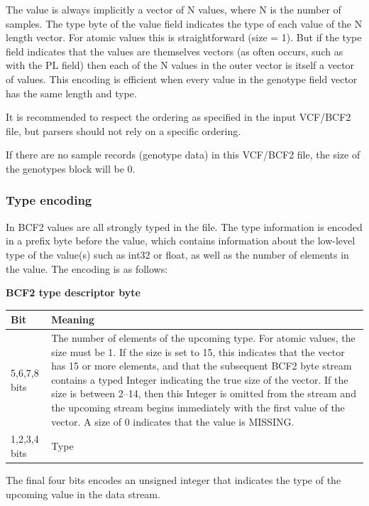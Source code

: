 \documentclass[8pt]{article}
\begin{document}
The value is always implicitly a vector of N values, where N is the number of samples.
The type byte of the value field indicates the type of each value of the N length vector.
For atomic values this is straightforward (size = 1).
But if the type field indicates that the values are themselves vectors (as often occurs, such as with the PL field) then each of the N values in the outer vector is itself a vector of values.
This encoding is efficient when every value in the genotype field vector has the same length and type.

It is recommended to respect the ordering as specified in the input VCF/BCF2 file, but parsers should not rely on a specific ordering.

If there are no sample records (genotype data) in this VCF/BCF2 file, the size of the genotypes block will be 0.


\subsubsection{Type encoding}
\label{BcfTypeEncoding}

In BCF2 values are all strongly typed in the file.
The type information is encoded in a prefix byte before the value, which contains information about the low-level type of the value(s) such as int32 or float, as well as the number of elements in the value.
The encoding is as follows:

\vspace{0.3cm}
\textbf{BCF2 type descriptor byte}

\vspace{0.3cm}
\begin{tabular}{|p{2cm} | p{10cm}|} \hline
Bit & Meaning \\ \hline
5,6,7,8 bits & The number of elements of the upcoming type. 
For atomic values, the size must be 1. 
If the size is set to 15, this indicates that the vector has 15 or more elements, and that the subsequent BCF2 byte stream contains a typed Integer indicating the true size of the vector. 
If the size is between 2--14, then this Integer is omitted from the stream and the upcoming stream begins immediately with the first value of the vector.
A size of 0 indicates that the value is MISSING. \\ \hline
1,2,3,4 bits & Type \\ \hline
\end{tabular}
\vspace{0.3cm}

The final four bits encodes an unsigned integer that indicates the type of the upcoming value in the data stream.
\end{document}
